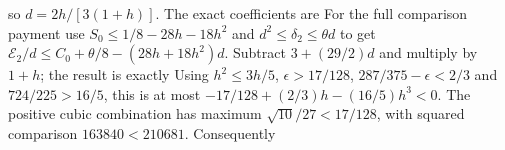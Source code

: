 so $d=\allowbreak 2h/[3(1+h)]$. The exact coefficients are
For the full comparison payment use $S_0\le\allowbreak 1/8-28h-18h^2$ and
$d^2\le\allowbreak \delta_2\le\allowbreak \theta d$ to get
$\mathcal E_2/d\le\allowbreak  C_0+\theta/8-(28h+18h^2)d$.
Subtract $3+(29/2)d$ and multiply by $1+h$; the result is exactly
Using $h^2\le\allowbreak 3h/5$, $\epsilon>\allowbreak 17/128$,
$287/375-\epsilon<\allowbreak 2/3$ and $724/225>\allowbreak 16/5$, this is at most
$-17/128+(2/3)h-(16/5)h^3<\allowbreak 0$.
The positive cubic combination has maximum $\sqrt{10}/27<\allowbreak 17/128$,
with squared comparison $163840<\allowbreak 210681$. Consequently

